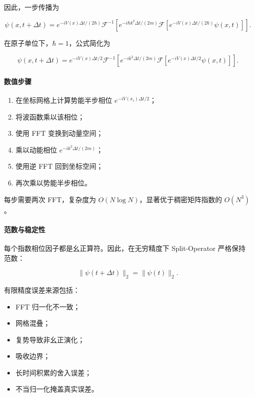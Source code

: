 \documentclass[
]{ctexbook}
\providecommand{\tightlist}{%
  \setlength{\itemsep}{0pt}\setlength{\parskip}{0pt}}
\begin{document}
因此，一步传播为

\[
\psi(x,t+\Delta t)
=
e^{-iV(x)\Delta t/(2\hbar)}
\mathcal{F}^{-1}
\left[
e^{-i\hbar k^2\Delta t/(2m)}
\mathcal{F}
\left[
e^{-iV(x)\Delta t/(2\hbar)}
\psi(x,t)
\right]
\right].
\]

在原子单位下，\(\hbar=1\)，公式简化为

\[
\psi(x,t+\Delta t)
=
e^{-iV(x)\Delta t/2}
\mathcal{F}^{-1}
\left[
e^{-ik^2\Delta t/(2m)}
\mathcal{F}
\left[
e^{-iV(x)\Delta t/2}
\psi(x,t)
\right]
\right].
\]

\hypertarget{ux6570ux503cux6b65ux9aa4}{%
\paragraph{数值步骤}\label{ux6570ux503cux6b65ux9aa4}}

\begin{enumerate}
\def\labelenumi{\arabic{enumi}.}
\tightlist
\item
  在坐标网格上计算势能半步相位 \(e^{-iV(x_i)\Delta t/2}\)；
\item
  将波函数乘以该相位；
\item
  使用 FFT 变换到动量空间；
\item
  乘以动能相位 \(e^{-ik^2\Delta t/(2m)}\)；
\item
  使用逆 FFT 回到坐标空间；
\item
  再次乘以势能半步相位。
\end{enumerate}

每步需要两次 FFT，复杂度为 \(O(N\log N)\)，显著优于稠密矩阵指数的
\(O(N^3)\)。

\hypertarget{ux8303ux6570ux4e0eux7a33ux5b9aux6027}{%
\paragraph{范数与稳定性}\label{ux8303ux6570ux4e0eux7a33ux5b9aux6027}}

每个指数相位因子都是幺正算符。因此，在无穷精度下 Split-Operator
严格保持范数：

\[
\|\psi(t+\Delta t)\|_2=\|\psi(t)\|_2.
\]

有限精度误差来源包括：

\begin{itemize}
\tightlist
\item
  FFT 归一化不一致；
\item
  网格混叠；
\item
  复势导致非幺正演化；
\item
  吸收边界；
\item
  长时间积累的舍入误差；
\item
  不当归一化掩盖真实误差。
\end{itemize}
\end{document}
